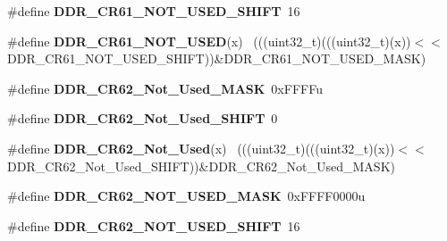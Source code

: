 \begin{DoxyCompactItemize}
\item 
\hypertarget{group___d_d_r___register___masks_ga8a77b5bbfb3190983f2dafdddc70b9ea}{}\#define {\bfseries D\+D\+R\+\_\+\+C\+R61\+\_\+\+N\+O\+T\+\_\+\+U\+S\+E\+D\+\_\+\+S\+H\+I\+F\+T}~16\label{group___d_d_r___register___masks_ga8a77b5bbfb3190983f2dafdddc70b9ea}

\item 
\hypertarget{group___d_d_r___register___masks_gadc1bfd8249b226b338286fd3bbd6e3ff}{}\#define {\bfseries D\+D\+R\+\_\+\+C\+R61\+\_\+\+N\+O\+T\+\_\+\+U\+S\+E\+D}(x)                                      ~(((uint32\+\_\+t)(((uint32\+\_\+t)(x))$<$$<$D\+D\+R\+\_\+\+C\+R61\+\_\+\+N\+O\+T\+\_\+\+U\+S\+E\+D\+\_\+\+S\+H\+I\+F\+T))\&D\+D\+R\+\_\+\+C\+R61\+\_\+\+N\+O\+T\+\_\+\+U\+S\+E\+D\+\_\+\+M\+A\+S\+K)\label{group___d_d_r___register___masks_gadc1bfd8249b226b338286fd3bbd6e3ff}

\item 
\hypertarget{group___d_d_r___register___masks_ga2c74f873f0af45ea7e45030dc67a190f}{}\#define {\bfseries D\+D\+R\+\_\+\+C\+R62\+\_\+\+Not\+\_\+\+Used\+\_\+\+M\+A\+S\+K}~0x\+F\+F\+F\+Fu\label{group___d_d_r___register___masks_ga2c74f873f0af45ea7e45030dc67a190f}

\item 
\hypertarget{group___d_d_r___register___masks_gad5a0d452f8322c0702130d4561320668}{}\#define {\bfseries D\+D\+R\+\_\+\+C\+R62\+\_\+\+Not\+\_\+\+Used\+\_\+\+S\+H\+I\+F\+T}~0\label{group___d_d_r___register___masks_gad5a0d452f8322c0702130d4561320668}

\item 
\hypertarget{group___d_d_r___register___masks_ga154cac575b848928860a10127064f568}{}\#define {\bfseries D\+D\+R\+\_\+\+C\+R62\+\_\+\+Not\+\_\+\+Used}(x)                                      ~(((uint32\+\_\+t)(((uint32\+\_\+t)(x))$<$$<$D\+D\+R\+\_\+\+C\+R62\+\_\+\+Not\+\_\+\+Used\+\_\+\+S\+H\+I\+F\+T))\&D\+D\+R\+\_\+\+C\+R62\+\_\+\+Not\+\_\+\+Used\+\_\+\+M\+A\+S\+K)\label{group___d_d_r___register___masks_ga154cac575b848928860a10127064f568}

\item 
\hypertarget{group___d_d_r___register___masks_ga3641c055a6eee236878bd58a8f363753}{}\#define {\bfseries D\+D\+R\+\_\+\+C\+R62\+\_\+\+N\+O\+T\+\_\+\+U\+S\+E\+D\+\_\+\+M\+A\+S\+K}~0x\+F\+F\+F\+F0000u\label{group___d_d_r___register___masks_ga3641c055a6eee236878bd58a8f363753}

\item 
\hypertarget{group___d_d_r___register___masks_ga9e661059f99d8260d5b2efa71a67cbc5}{}\#define {\bfseries D\+D\+R\+\_\+\+C\+R62\+\_\+\+N\+O\+T\+\_\+\+U\+S\+E\+D\+\_\+\+S\+H\+I\+F\+T}~16\label{group___d_d_r___register___masks_ga9e661059f99d8260d5b2efa71a67cbc5}


\end{DoxyCompactItemize}
